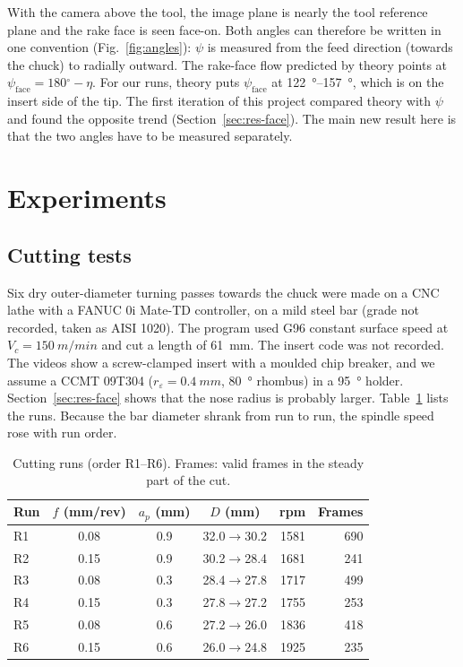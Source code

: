 \documentclass[conference,a4paper]{IEEEtran}
\newcommand{\degr}{\ensuremath{^\circ}}
\begin{document}
With the camera above the tool, the image plane is nearly the tool reference plane and the rake face is seen face-on.
Both angles can therefore be written in one convention (Fig.~\ref{fig:angles}): $\psi$ is measured from the feed direction (towards the chuck) to radially outward.
The rake-face flow predicted by theory points at $\psi_\mathrm{face}=180\degr-\eta$.
For our runs, theory puts $\psi_\mathrm{face}$ at \SIrange{122}{157}{\degree}, which is on the insert side of the tip.
The first iteration of this project compared theory with $\psi$ and found the opposite trend (Section~\ref{sec:res-face}).
The main new result here is that the two angles have to be measured separately.

\section{Experiments}
\subsection{Cutting tests}
Six dry outer-diameter turning passes towards the chuck were made on a CNC lathe with a FANUC 0i Mate-TD controller, on a mild steel bar (grade not recorded, taken as AISI 1020).
The program used G96 constant surface speed at $V_c=\SI{150}{m/min}$ and cut a length of \SI{61}{mm}.
The insert code was not recorded.
The videos show a screw-clamped insert with a moulded chip breaker, and we assume a CCMT 09T304 ($r_\varepsilon=\SI{0.4}{mm}$, \SI{80}{\degree} rhombus) in a \SI{95}{\degree} holder.
Section~\ref{sec:res-face} shows that the nose radius is probably larger.
Table~\ref{tab:runs} lists the runs.
Because the bar diameter shrank from run to run, the spindle speed rose with run order.

\begin{table}[t]
\caption{Cutting runs (order R1--R6). Frames: valid frames in the steady part of the cut.}
\label{tab:runs}
\centering\small
\begin{tabular}{@{}lcccrr@{}}
\toprule
Run & $f$ (mm/rev) & $a_p$ (mm) & $D$ (mm) & rpm & Frames \\
\midrule
R1 & 0.08 & 0.9 & 32.0$\to$30.2 & 1581 & 690 \\
R2 & 0.15 & 0.9 & 30.2$\to$28.4 & 1681 & 241 \\
R3 & 0.08 & 0.3 & 28.4$\to$27.8 & 1717 & 499 \\
R4 & 0.15 & 0.3 & 27.8$\to$27.2 & 1755 & 253 \\
R5 & 0.08 & 0.6 & 27.2$\to$26.0 & 1836 & 418 \\
R6 & 0.15 & 0.6 & 26.0$\to$24.8 & 1925 & 235 \\
\bottomrule
\end{tabular}
\end{table}
\end{document}
